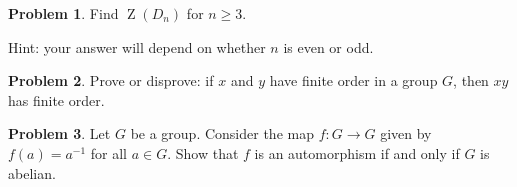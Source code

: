 \documentclass[11pt]{article}
\DeclareMathOperator{\Z}{Z}
\theoremstyle{definition}
\newtheorem{problem}{Problem}
\begin{document}
\begin{problem}
Find $\Z(D_{n})$ for $n \geqslant 3$.  

\noindent Hint: your answer will depend on whether $n$ is even or odd.
\end{problem}




\begin{problem}
	Prove or disprove: if $x$ and $y$ have finite order in a group $G$, then $xy$ has finite order.
\end{problem}



\begin{problem}
Let $G$ be a group. Consider the map $f \!: G \longrightarrow G$ given by $f(a)=a^{-1}$ for all $a\in G$. Show that $f$ is an automorphism if and only if $G$ is abelian.
\end{problem}
\end{document}
